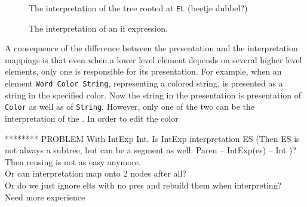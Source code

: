 \begin{figure}
\begin{center}
\begin{center}
%
%
\end{center}
\caption{The interpretation of the tree rooted at {\tt EL} (beetje dubbel?)}\label{elementInterpretation} 
\end{center}
\end{figure}


\toHere     %

\begin{figure}
\begin{center}
\begin{center}
\end{center}
\caption{The interpretation of an if expression.}\label{interpretExample} 
\end{center}
\end{figure}

A consequence of the difference between the presentation and the interpretation mappings is that even when a lower level element depends on several higher level elements, only one is responsible for its presentation. For example, when an element \verb|Word Color String|, representing a colored string, is presented as a string in the specified color. Now the string in the presentation is presentation of \verb|Color| as well as of \verb|String|. However, only one of the two can be the interpretation of the . In order to edit the color


   

******** PROBLEM With IntExp  Int. 
Is IntExp interpretation ES (Then ES is not always a subtree, but can be a segment as well: Paren -- IntExp(es) -- Int )? Then reusing is not as easy anymore.\\
Or can interpretation map onto 2 nodes after all?\\
Or do we just ignore elts with no pres and rebuild them when interpreting?\\
Need more experience



